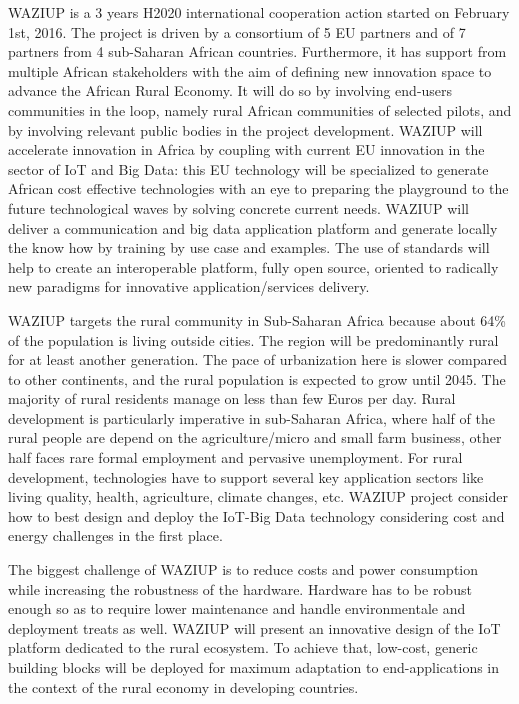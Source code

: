 WAZIUP is a 3 years H2020 international cooperation action started on February 1st, 2016.
The project is driven by a consortium of 5 EU partners and of 7 partners from 4 sub-Saharan African countries.
Furthermore, it has support from multiple African stakeholders with the aim of defining new innovation space to advance the African Rural Economy.
It will do so by involving end-users communities in the loop, namely rural African communities of selected pilots, and by involving relevant public bodies in the project development.
WAZIUP will accelerate innovation in Africa by coupling with current EU innovation in the sector of IoT and Big Data: this EU technology will be specialized to generate African cost effective technologies with an eye to preparing the playground to the future technological waves by solving concrete current needs.
WAZIUP will deliver a communication and big data application platform and generate locally the know how by training by use case and examples.
The use of standards will help to create an interoperable platform, fully open source, oriented to radically new paradigms for innovative application/services delivery.

WAZIUP targets the rural community in Sub-Saharan Africa because about 64\% of the population is living outside cities.
The region will be predominantly rural for at least another generation.
The pace of urbanization here is slower compared to other continents, and the rural population is expected to grow until 2045.
The majority of rural residents manage on less than few Euros per day.
Rural development is particularly imperative in sub-Saharan Africa, where half of the rural people are depend on the agriculture/micro and small farm business, other half faces rare formal employment and pervasive unemployment.
For rural development, technologies have to support several key application sectors like living quality, health, agriculture, climate changes, etc.
WAZIUP project consider how to best design and deploy the IoT-Big Data technology considering cost and energy challenges in the first place.

The biggest challenge of WAZIUP is to reduce costs and power consumption while increasing the robustness of the hardware. Hardware has to be robust enough so as to require lower maintenance and handle environmentale and deployment treats as well. 
WAZIUP will present an innovative design of the IoT platform dedicated to the rural ecosystem. To achieve that, low-cost, generic building blocks will be deployed for maximum adaptation to end-applications in the context of the rural economy in developing countries. 

